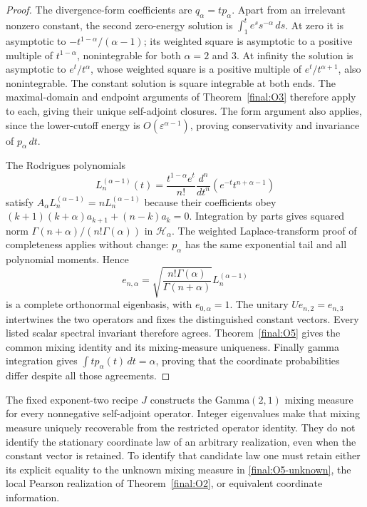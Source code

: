 \begin{proof}
The divergence-form coefficients are $q_\alpha=tp_\alpha$.
Apart from an irrelevant nonzero constant, the second zero-energy
solution is $\int_1^t e^s s^{-\alpha}\,ds$.
At zero it is asymptotic to
$-t^{1-\alpha}/(\alpha-1)$; its weighted square is asymptotic to a
positive multiple of $t^{1-\alpha}$, nonintegrable for both
$\alpha=2$ and $3$.  At infinity the solution is asymptotic to
$e^t/t^\alpha$, whose weighted square is a positive multiple of
$e^t/t^{\alpha+1}$, also nonintegrable.
The constant solution is square integrable at both ends.
The maximal-domain and endpoint arguments of Theorem~\ref{final:O3}
therefore apply to each, giving their unique self-adjoint closures.
The form argument also applies, since the lower-cutoff energy is
$O(\varepsilon^{\alpha-1})$, proving conservativity and invariance
of $p_\alpha\,dt$.

The Rodrigues polynomials
\[
 L_n^{(\alpha-1)}(t)=
   \frac{t^{1-\alpha}e^t}{n!}
      \frac{d^n}{dt^n}(e^{-t}t^{n+\alpha-1})
\]
satisfy $A_\alpha L_n^{(\alpha-1)}=nL_n^{(\alpha-1)}$ because their
coefficients obey
$(k+1)(k+\alpha)a_{k+1}+(n-k)a_k=0$.
Integration by parts gives squared norm
$\Gamma(n+\alpha)/(n!\Gamma(\alpha))$ in $\mathcal H_\alpha$.
The weighted Laplace-transform proof of completeness applies without
change: $p_\alpha$ has the same exponential tail and all polynomial
moments.  Hence
\[
 e_{n,\alpha}=
 \sqrt{\frac{n!\Gamma(\alpha)}{\Gamma(n+\alpha)}}
       L_n^{(\alpha-1)}
\]
is a complete orthonormal eigenbasis, with $e_{0,\alpha}=1$.
The unitary $Ue_{n,2}=e_{n,3}$ intertwines the two operators and
fixes the distinguished constant vectors.  Every listed scalar
spectral invariant therefore agrees.  Theorem~\ref{final:O5}
gives the common mixing identity and its mixing-measure uniqueness.
Finally gamma integration gives
$\int t p_\alpha(t)\,dt=\alpha$, proving that the coordinate
probabilities differ despite all those agreements.
\end{proof}

\begin{corollary}
\label{final:O5-canonical-versus-identification}
The fixed exponent-two recipe $J$ constructs the Gamma$(2,1)$ mixing
measure for every nonnegative self-adjoint operator.  Integer
eigenvalues make that mixing measure uniquely recoverable from the
restricted operator identity.  They do not identify the stationary
coordinate law of an arbitrary realization, even when the constant
vector is retained.  To identify that candidate law one must retain
either its explicit equality to the unknown mixing measure in
\eqref{final:O5-unknown}, the local Pearson realization of
Theorem~\ref{final:O2}, or equivalent coordinate information.
\end{corollary}

